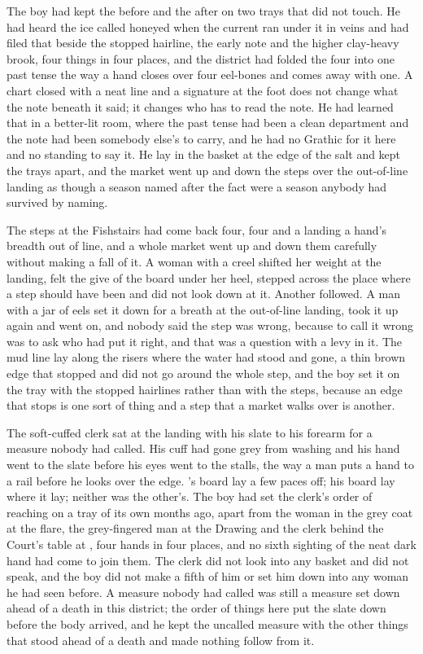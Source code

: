 The boy had kept the before and the after on two trays that did not touch. He had heard the ice called honeyed when the current ran under it in veins and had filed that beside the stopped hairline, the early note and the higher clay-heavy brook, four things in four places, and the district had folded the four into one past tense the way a hand closes over four eel-bones and comes away with one. A chart closed with a neat line and a signature at the foot does not change what the note beneath it said; it changes who has to read the note. He had learned that in a better-lit room, where the past tense had been a clean department and the note had been somebody else's to carry, and he had no Grathic for it here and no standing to say it. He lay in the basket at the edge of the salt and kept the trays apart, and the market went up and down the steps over the out-of-line landing as though a season named after the fact were a season anybody had survived by naming.

\scenebreak

The steps at the Fishstairs had come back four, four and a landing a hand's breadth out of line, and a whole market went up and down them carefully without making a fall of it. A woman with a creel shifted her weight at the landing, felt the give of the board under her heel, stepped across the place where a step should have been and did not look down at it. Another followed. A man with a jar of eels set it down for a breath at the out-of-line landing, took it up again and went on, and nobody said the step was wrong, because to call it wrong was to ask who had put it right, and that was a question with a levy in it. The mud line lay along the risers where the water had stood and gone, a thin brown edge that stopped and did not go around the whole step, and the boy set it on the tray with the stopped hairlines rather than with the steps, because an edge that stops is one sort of thing and a step that a market walks over is another.

The soft-cuffed clerk sat at the landing with his slate to his forearm for a measure nobody had called. His cuff had gone grey from washing and his hand went to the slate before his eyes went to the stalls, the way a man puts a hand to a rail before he looks over the edge. 's board lay a few paces off; his board lay where it lay; neither was the other's. The boy had set the clerk's order of reaching on a tray of its own months ago, apart from the woman in the grey coat at the flare, the grey-fingered man at the Drawing and the clerk behind the Court's table at , four hands in four places, and no sixth sighting of the neat dark hand had come to join them. The clerk did not look into any basket and did not speak, and the boy did not make a fifth of him or set him down into any woman he had seen before. A measure nobody had called was still a measure set down ahead of a death in this district; the order of things here put the slate down before the body arrived, and he kept the uncalled measure with the other things that stood ahead of a death and made nothing follow from it.

